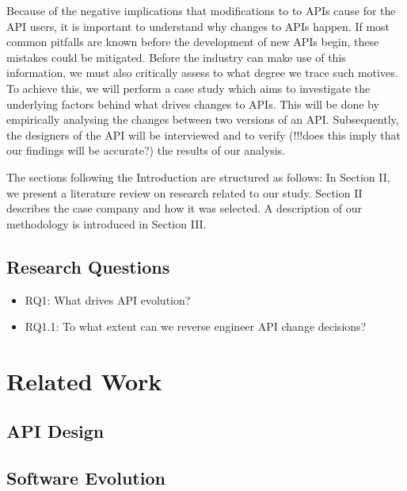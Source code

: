 \documentclass[10pt,twocolumn]{article}
\begin{document}
Because of the negative implications that modifications to to APIs cause for the API users, it is important to understand why changes to APIs happen. If most common pitfalls are known before the development of new APIs begin, these mistakes could be mitigated. Before the industry can make use of this information, we must also critically assess to what degree we trace such motives. To achieve this, we will perform a case study which aims to investigate the underlying factors behind what drives changes to APIs. This will be done by empirically analysing the changes between two versions of an API. Subsequently, the designers of the API will be interviewed and to verify (!!!does this imply that our findings will be accurate?) the results of our analysis. 

The sections following the Introduction are structured as follows: In Section II, we present a literature review on research related to our study. Section II describes the case company and how it was selected. A description of our methodology is introduced in Section III. 

\subsection{Research Questions}
\begin{itemize}
\item RQ1: What drives API evolution? 
\item RQ1.1: To what extent can we reverse engineer API change decisions?
\end{itemize}


\section{Related Work}

\subsection{API Design}

\subsection{Software Evolution}
\end{document}
